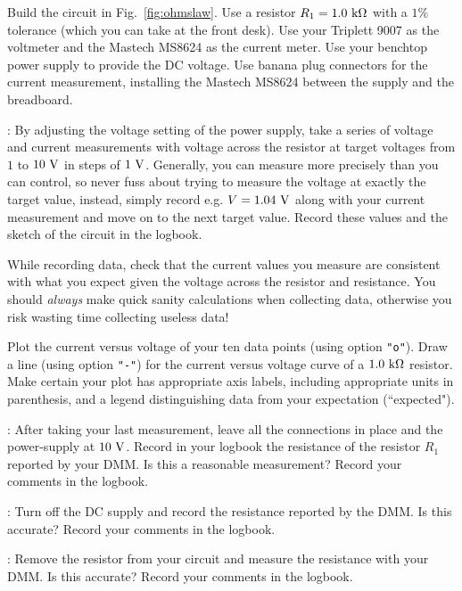 Build the circuit in Fig.~\ref{fig:ohmslaw}.  Use a resistor $R_1 =
1.0~{\rm k\Omega}$ with a $1\%$ tolerance (which you can take at the
front desk).  Use your Triplett 9007 as the voltmeter and the Mastech
MS8624 as the current meter.  Use your benchtop power supply to
provide the DC voltage.  Use banana plug connectors for the current
measurement, installing the Mastech MS8624 between the supply and the
breadboard.

\begin{measurement}: 
By adjusting the voltage setting of the power supply, take a series of
voltage and current measurements with voltage across the resistor at
target voltages from $1$ to $10~\rm V$ in steps of $1~\rm
V$. Generally, you can measure more precisely than you can control, so
never fuss about trying to measure the voltage at exactly the target
value, instead, simply record e.g. $V=1.04~\rm V$ along with your
current measurement and move on to the next target value. Record these
values and the sketch of the circuit in the logbook. 
\end{measurement}

While recording data, check that the current values you measure are
consistent with what you expect given the voltage across the resistor
and resistance.  You should {\em always} make quick sanity
calculations when collecting data, otherwise you risk wasting time
collecting useless data!

\begin{plot} 
Plot the current versus voltage of your ten data points (using option
{\tt "o"}).  Draw a line (using option {\tt "-"}) for the current
versus voltage curve of a $1.0~\rm k\Omega$ resistor.  Make certain
your plot has appropriate axis labels, including appropriate units in
parenthesis, and a legend distinguishing data from your expectation
(``expected").  
\end{plot}

\begin{measurement}: 
After taking your last measurement, leave all the connections in place
and the power-supply at $10~\rm V$.  Record in your logbook the
resistance of the resistor $R_1$ reported by your DMM.  Is this a
reasonable measurement? Record your comments in the
logbook. 
\end{measurement}

 \begin{measurement}: 
Turn off the DC supply and record the resistance reported by the DMM.
Is this accurate? Record your comments in the
logbook.  
\end{measurement}
\begin{measurement}: 
Remove the resistor from your circuit and measure the resistance with
your DMM.  Is this accurate? Record your comments in the
logbook. 
\end{measurement}

